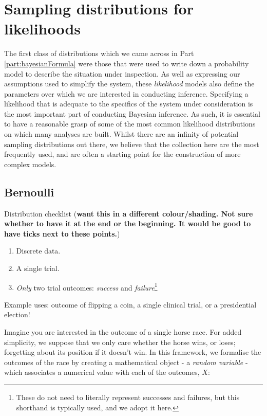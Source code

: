 \documentclass[11pt,fullpage]{book}
\begin{document}
\section{Sampling distributions for likelihoods}
The first class of distributions which we came across in Part \ref{part:bayesianFormula} were those that were used to write down a probability model to describe the situation under inspection. As well as expressing our assumptions used to simplify the system, these \textit{likelihood} models also define the parameters over which we are interested in conducting inference. Specifying a likelihood that is adequate to the specifics of the system under consideration is the most important part of conducting Bayesian inference. As such, it is essential to have a reasonable grasp of some of the most common likelihood distributions on which many analyses are built. Whilst there are an infinity of potential sampling distributions out there, we believe that the collection here are the most frequently used, and are often a starting point for the construction of more complex models.

\subsection{Bernoulli}\label{sec:Distributions_bernoulli}

Distribution checklist (\textbf{want this in a different colour/shading. Not sure whether to have it at the end or the beginning. It would be good to have ticks next to these points.})

\begin{enumerate}
\item Discrete data.
\item A single trial.
\item \textit{Only} two trial outcomes: \textit{success} and \textit{failure}\footnote{These do not need to literally represent successes and failures, but this shorthand is typically used, and we adopt it here.}
\end{enumerate}

Example uses: outcome of flipping a coin, a single clinical trial, or a presidential election!

Imagine you are interested in the outcome of a single horse race. For added simplicity, we suppose that we only care whether the horse wins, or loses; forgetting about its position if it doesn't win. In this framework, we formalise the outcomes of the race by creating a mathematical object - a \textit{random variable} - which associates a numerical value with each of the outcomes, $X$:
\end{document}
